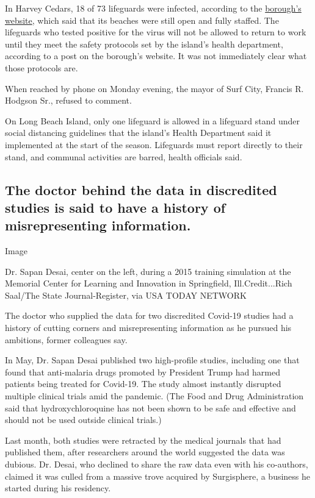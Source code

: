 In Harvey Cedars, 18 of 73 lifeguards were infected, according to the
\href{http://www.harveycedars.org/}{borough's website}, which said that
its beaches were still open and fully staffed. The lifeguards who tested
positive for the virus will not be allowed to return to work until they
meet the safety protocols set by the island's health department,
according to a post on the borough's website. It was not immediately
clear what those protocols are.

When reached by phone on Monday evening, the mayor of Surf City, Francis
R. Hodgson Sr., refused to comment.

On Long Beach Island, only one lifeguard is allowed in a lifeguard stand
under social distancing guidelines that the island's Health Department
said it implemented at the start of the season. Lifeguards must report
directly to their stand, and communal activities are barred, health
officials said.

\hypertarget{the-doctor-behind-the-data-in-discredited-studies-is-said-to-have-a-history-of-misrepresenting-information}{%
\subsection{The doctor behind the data in discredited studies is said to
have a history of misrepresenting
information.}\label{the-doctor-behind-the-data-in-discredited-studies-is-said-to-have-a-history-of-misrepresenting-information}}

Image

Dr. Sapan Desai, center on the left, during a 2015 training simulation
at the Memorial Center for Learning and Innovation in Springfield,
Ill.Credit...Rich Saal/The State Journal-Register, via USA TODAY NETWORK

The doctor who supplied the data for two discredited Covid-19 studies
had a history of cutting corners and misrepresenting information as he
pursued his ambitions, former colleagues say.

In May, Dr. Sapan Desai published two high-profile studies, including
one that found that anti-malaria drugs promoted by President Trump had
harmed patients being treated for Covid-19. The study almost instantly
disrupted multiple clinical trials amid the pandemic. (The Food and Drug
Administration said that hydroxychloroquine has not been shown to be
safe and effective and should not be used outside clinical trials.)

Last month, both studies were retracted by the medical journals that had
published them, after researchers around the world suggested the data
was dubious. Dr. Desai, who declined to share the raw data even with his
co-authors, claimed it was culled from a massive trove acquired by
Surgisphere, a business he started during his residency.

